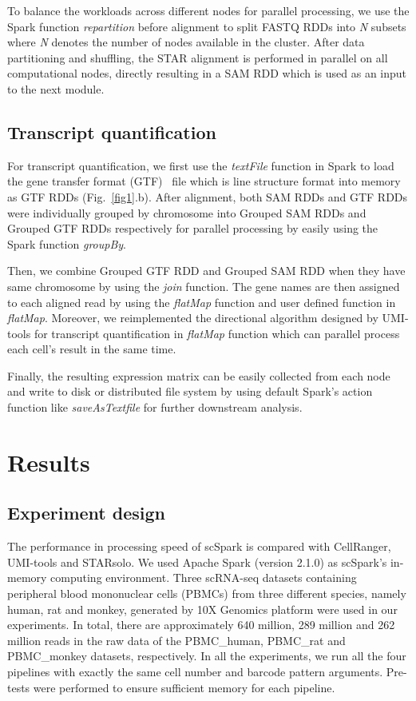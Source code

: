 \documentclass[conference]{IEEEtran}
\begin{document}
To balance the workloads across different nodes for parallel processing, we use the Spark function \textit{repartition} before alignment to split FASTQ RDDs into \textit{N} subsets where \textit{N} denotes the number of nodes available in the cluster.
After data partitioning and shuffling, the STAR alignment is performed in parallel on all computational nodes, directly resulting in a SAM RDD which is used as an input to the next module.

\subsection{Transcript quantification}
For transcript quantification, we first use the \textit{textFile} function in Spark to load the gene transfer format (GTF)~\cite{breese2013ngsutils} file which is line structure format into memory as GTF RDDs (Fig.~\ref{fig1}.b). 
After alignment, both SAM RDDs and GTF RDDs were individually grouped by chromosome into Grouped SAM RDDs and Grouped GTF RDDs respectively for parallel processing by easily using the Spark function \textit{groupBy}. 

Then, we combine Grouped GTF RDD and Grouped SAM RDD when they have same chromosome by using the \textit{join} function.
The gene names are then assigned to each aligned read by using the \textit{flatMap} function and user defined function in \textit{flatMap}. 
Moreover, we reimplemented the directional algorithm designed by UMI-tools for transcript quantification in \textit{flatMap} function which can parallel process each cell's result in the same time. 

Finally, the resulting expression matrix can be easily collected from each node and write to disk or distributed file system by using default Spark's action function like \textit{saveAsTextfile} for further downstream analysis. 

\section{Results}

\subsection{Experiment design}
The performance in processing speed of scSpark is compared with CellRanger, UMI-tools and STARsolo. 
We used Apache Spark (version 2.1.0) as scSpark's in-memory computing environment. 
Three scRNA-seq datasets containing peripheral blood mononuclear cells (PBMCs) from three different species, namely human, rat and monkey, generated by 10X Genomics platform were used in our experiments. 
In total, there are approximately 640 million, 289 million and 262 million reads in the raw data of the PBMC\_human, PBMC\_rat and PBMC\_monkey datasets, respectively. 
In all the experiments, we run all the four pipelines with exactly the same cell number and barcode pattern arguments.
Pre-tests were performed to ensure sufficient memory for each pipeline.
\end{document}
